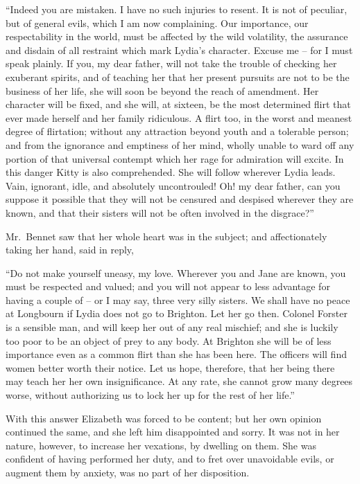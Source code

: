 “Indeed you are mistaken. I have no such injuries
to resent. It is not of peculiar, but of general evils,
which I am now complaining. Our importance, our
respectability in the world, must be affected by the wild
volatility, the assurance and disdain of all restraint which
mark Lydia’s character. Excuse me -- for I must speak
plainly. If you, my dear father, will not take the trouble
of checking her exuberant spirits, and of teaching her that
her present pursuits are not to be the business of her life,
she will soon be beyond the reach of amendment. Her
character will be fixed, and she will, at sixteen, be the most
determined flirt that ever made herself and her family
ridiculous. A flirt too, in the worst and meanest degree
of flirtation; without any attraction beyond youth and
a tolerable person; and from the ignorance and emptiness
of her mind, wholly unable to ward off any portion of
that universal contempt which her rage for admiration
will excite. In this danger Kitty is also comprehended.
She will follow wherever Lydia leads. Vain, ignorant,
idle, and absolutely uncontrouled! Oh! my dear father,
can you suppose it possible that they will not be censured
and despised wherever they are known, and that their
sisters will not be often involved in the disgrace?”

Mr.\ Bennet saw that her whole heart was in the subject;
and affectionately taking her hand, said in reply,

“Do not make yourself uneasy, my love. Wherever
you and Jane are known, you must be respected and
valued; and you will not appear to less advantage for
having a couple of -- or I may say, three very silly sisters.
We shall have no peace at Longbourn if Lydia does not
go to Brighton. Let her go then. Colonel Forster is
a sensible man, and will keep her out of any real mischief;
and she is luckily too poor to be an object of prey to
any body. At Brighton she will be of less importance even
as a common flirt than she has been here. The officers
will find women better worth their notice. Let us hope,
therefore, that her being there may teach her her own
insignificance. At any rate, she cannot grow many degrees
worse, without authorizing us to lock her up for the rest
of her life.”

With this answer Elizabeth was forced to be content;
but her own opinion continued the same, and she left
him disappointed and sorry. It was not in her nature,
however, to increase her vexations, by dwelling on them.
She was confident of having performed her duty, and to
fret over unavoidable evils, or augment them by anxiety,
was no part of her disposition.

